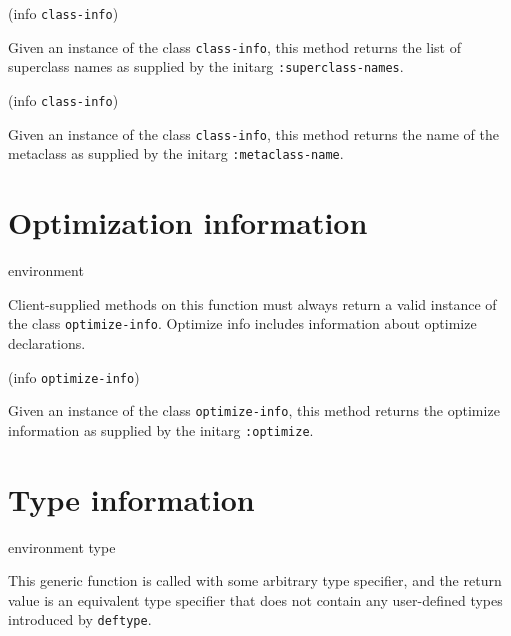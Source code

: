  {(info {\tt class-info})}

Given an instance of the class \texttt{class-info}, this
method returns the list of superclass names as supplied by the
initarg \texttt{:superclass-names}.

 {(info {\tt class-info})}

Given an instance of the class \texttt{class-info}, this
method returns the name of the metaclass as supplied by the
initarg \texttt{:metaclass-name}.

\section{Optimization information}

 {environment}

Client-supplied methods on this function must always return a valid
instance of the class \texttt{optimize-info}. Optimize info includes
information about optimize declarations.


 {(info {\tt optimize-info})}

Given an instance of the class \texttt{optimize-info}, this method 
returns the optimize information as supplied by the initarg
\texttt{:optimize}.

\section{Type information}

 {environment type}

This generic function is called with some arbitrary type specifier,
and the return value is an equivalent type specifier that does not
contain any user-defined types introduced by \texttt{deftype}. 
